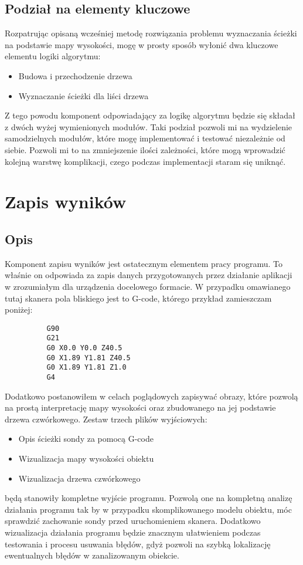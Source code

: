 \documentclass[a4paper,12pt,twoside,openany]{report}
\begin{document}
      \subsection{Podział na elementy kluczowe}
        Rozpatrując opisaną wcześniej metodę rozwiązania problemu wyznaczania ścieżki na podstawie mapy wysokości, 
        mogę w prosty sposób wyłonić dwa kluczowe elementu logiki algorytmu:
        \begin{itemize}
          \item Budowa i przechodzenie drzewa
          \item Wyznaczanie ścieżki dla liści drzewa
        \end{itemize}
        Z tego powodu komponent odpowiadający za logikę algorytmu będzie się składał z dwóch wyżej wymienionych modułów.
        Taki podział pozwoli mi na wydzielenie samodzielnych modułów, które mogę implementować i testować niezależnie od siebie.
        Pozwoli mi to na zmniejszenie ilości zależności, które mogą wprowadzić kolejną warstwę komplikacji, czego podczas 
        implementacji staram się uniknąć.

    \section{Zapis wyników}
      \subsection{Opis}
        Komponent zapisu wyników jest ostatecznym elementem pracy programu. To właśnie on odpowiada za zapis 
        danych przygotowanych przez działanie aplikacji w zrozumiałym dla urządzenia docelowego formacie. W przypadku 
        omawianego tutaj skanera pola bliskiego jest to G-code, którego przykład zamieszczam poniżej:
        \begin{lstlisting}
          G90
          G21
          G0 X0.0 Y0.0 Z40.5
          G0 X1.89 Y1.81 Z40.5
          G0 X1.89 Y1.81 Z1.0
          G4
        \end{lstlisting}
        Dodatkowo postanowiłem w celach poglądowych zapisywać obrazy, które pozwolą na prostą interpretację mapy wysokości 
        oraz zbudowanego na jej podstawie drzewa czwórkowego. Zestaw trzech plików wyjściowych:
        \begin{itemize}
          \item Opis ścieżki sondy za pomocą G-code
          \item Wizualizacja mapy wysokości obiektu
          \item Wizualizacja drzewa czwórkowego
        \end{itemize}
        będą stanowiły kompletne wyjście programu. Pozwolą one na kompletną analizę działania programu tak by w przypadku 
        skomplikowanego modelu obiektu, móc sprawdzić zachowanie sondy przed uruchomieniem skanera.
        Dodatkowo wizualizacja działania programu będzie znacznym ułatwieniem podczas testowania i procesu usuwania błędów, 
        gdyż pozwoli na szybką lokalizację ewentualnych błędów w zanalizowanym obiekcie.
\end{document}
